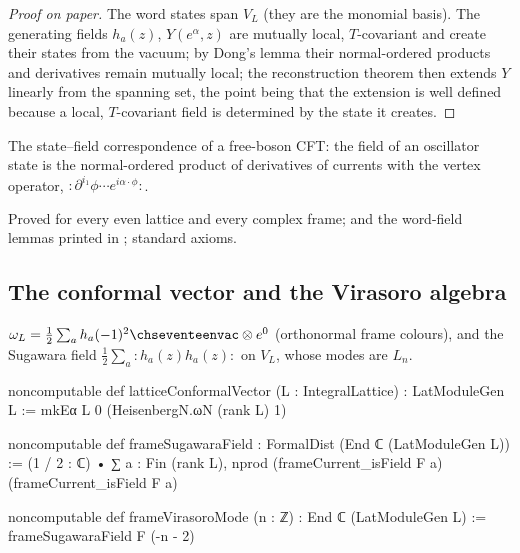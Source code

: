 \begin{proof}[Proof on paper]
The word states span $V_L$ (they are the monomial basis).  The generating fields $h_a(z)$, $Y(e^\alpha,z)$ are
mutually local, $T$-covariant and create their states from the vacuum; by Dong's lemma their normal-ordered
products and derivatives remain mutually local; the reconstruction theorem then extends $Y$ linearly from the
spanning set, the point being that the extension is well defined because a local, $T$-covariant field is
determined by the state it creates.
\end{proof}

\begin{physics}
The state--field correspondence of a free-boson CFT: the field of an oscillator state is the normal-ordered
product of derivatives of currents with the vertex operator, ${:}\partial^{i_1}\phi\cdots e^{i\alpha\cdot\phi}{:}$.
\end{physics}

\begin{status}
Proved for every even lattice and every complex frame;  and the word-field
lemmas printed in ; standard axioms.
\end{status}

\subsection{The conformal vector and the Virasoro algebra}

\begin{definition}\label{ch17:def:omega}
$\omega_L=\tfrac12\sum_ah_a(-1)^2\chseventeenvac\otimes e^0$ (orthonormal frame colours), and the Sugawara field
$\tfrac12\sum_a{:}h_a(z)h_a(z){:}$ on $V_L$, whose modes are $L_n$.
\end{definition}

\begin{leancode}
noncomputable def latticeConformalVector (L : IntegralLattice) : LatModuleGen L := mkEα L 0 (HeisenbergN.ωN (rank L) 1)

noncomputable def frameSugawaraField : FormalDist (End ℂ (LatModuleGen L)) :=
  (1 / 2 : ℂ) • ∑ a : Fin (rank L), nprod (frameCurrent_isField F a) (frameCurrent_isField F a)

noncomputable def frameVirasoroMode (n : ℤ) : End ℂ (LatModuleGen L) := frameSugawaraField F (-n - 2)
\end{leancode}

